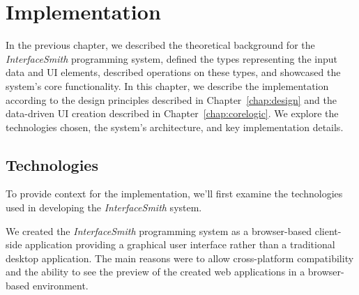 \chapter{Implementation}
\label{chap:implementation}

In the previous chapter, we described the theoretical background for the \emph{InterfaceSmith} programming system, defined the types representing the input data and UI elements, described operations on these types, and showcased the system's core functionality.
In this chapter, we describe the implementation according to the design principles described in Chapter~\ref{chap:design} and the data-driven UI creation described in Chapter~\ref{chap:corelogic}.
We explore the technologies chosen, the system's architecture, and key implementation details.
\medskip
\section{Technologies}
\label{sec:technologies}
To provide context for the implementation, we'll first examine the technologies used in developing the \emph{InterfaceSmith} system.

We created the \emph{InterfaceSmith} programming system as a browser-based client-side application providing a graphical user interface rather than a traditional desktop application.
The main reasons were to allow cross-platform compatibility and the ability to see the preview of the created web applications in a browser-based environment.

